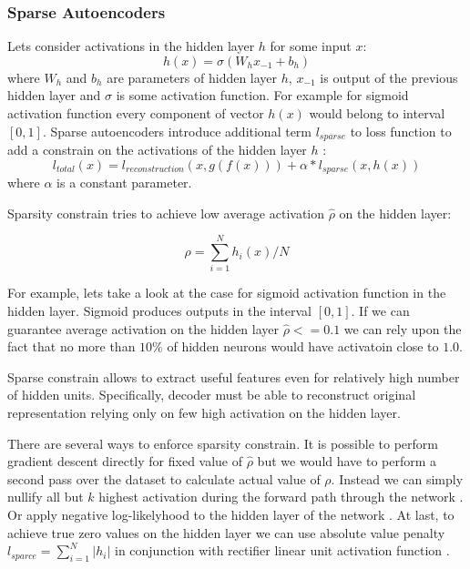 \subsubsection{Sparse Autoencoders}\label{ch:vae}

Lets consider activations in the hidden layer $h$ for some input $x$:
\begin{equation}
  h(x) = \sigma(W_{h}x_{-1} + b_{h})
\end{equation}
where $W_h$ and $b_h$ are parameters of hidden layer $h$, $x_{-1}$ is output of the previous hidden layer and $\sigma$ is some activation function.
For example for sigmoid activation function every component of vector $h(x)$ would belong to interval $[0, 1]$.
Sparse autoencoders introduce additional term $l_{sparse}$ to loss function to add a constrain on the activations of the hidden layer $h$ \cite{Ng2011}:
\begin{equation}
  l_{total}(x) = l_{reconstruction}(x, g(f(x))) + \alpha*l_{sparse}(x, h(x))
\end{equation}
where $\alpha$ is a constant parameter.

Sparsity constrain tries to achieve low average activation $\hat{\rho}$ on the hidden layer:

\begin{equation}\label{eq:avgh}
  \rho = \sum_{i=1}^N h_i(x)/N
\end{equation}

For example, lets take a look at the case for sigmoid activation function in the hidden layer.
Sigmoid produces outputs in the interval $[0, 1]$. If we can guarantee average activation on the hidden layer $\hat{\rho} <= 0.1$ we can rely upon the fact that no more than $10\%$ of hidden neurons would have activatoin close to $1.0$.

Sparse constrain allows to extract useful features even for relatively high number of hidden units. Specifically, decoder must be able to reconstruct original representation relying only on few high activation on the hidden layer.

There are several ways to enforce sparsity constrain.
It is possible to perform gradient descent directly for fixed value of $\hat{\rho}$ but we would have to perform a second pass over the dataset to calculate actual value of $\rho$. Instead we can simply nullify all but $k$ highest activation during the forward path through the network \cite{Kulkarni2015}.
Or apply negative log-likelyhood to the hidden layer of the network \cite{Zhao2015}.
At last, to achieve true zero values on the hidden layer we can use absolute value penalty $l_{sparce}=\sum_{i=1}^N |h_i|$ in conjunction with rectifier linear unit activation function \cite{Glorot2011}.

